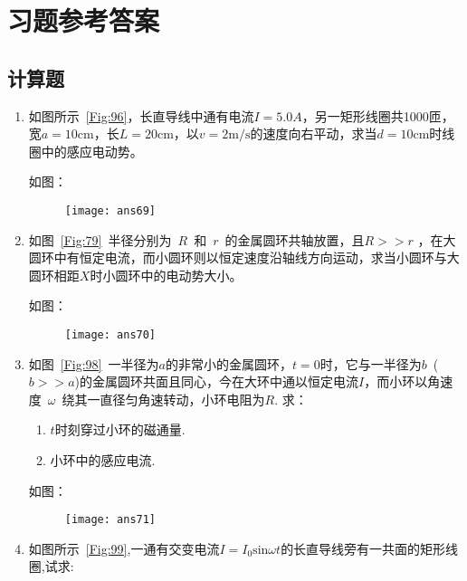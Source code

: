 \section{习题参考答案}
\subsection*{计算题}
\begin{enumerate}
    \item 如图所示~\ref{Fig:96}，长直导线中通有电流$I=5.0A$，另一矩形线圈共1000匝，宽$a=10\mathrm{cm}$，长$L=20\mathrm{cm}$，以$v=2\mathrm{m/s}$的速度向右平动，求当$d=10\mathrm{cm}$时线圈中的感应电动势。
    \begin{solution}
        如图：
        \begin{figure}[H]
            \centering
            \texttt{[image: ans69]}
        \end{figure}
    \end{solution}
    \item 如图~\ref{Fig:79}~半径分别为~$R$~和~$r$~的金属圆环共轴放置，且$R>>r$ ，在大圆环中有恒定电流，而小圆环则以恒定速度沿轴线方向运动，求当小圆环与大圆环相距$X$时小圆环中的电动势大小。
    \begin{solution}
        如图：
        \begin{figure}[H]
            \centering
            \texttt{[image: ans70]}
        \end{figure}
    \end{solution}
    \item 如图~\ref{Fig:98}~一半径为$a$的非常小的金属圆环，$t=0$时，它与一半径为$b$~($b>>a$)的金属圆环共面且同心，今在大环中通以恒定电流$I$，而小环以角速度~$\omega$~绕其一直径匀角速转动，小环电阻为$R$. 求：
    \begin{enumerate}[label=(\arabic*)]
        \item  $t$时刻穿过小环的磁通量.
        \item 小环中的感应电流.
    \end{enumerate}
    \begin{solution}
        如图：
        \begin{figure}[H]
            \centering
            \texttt{[image: ans71]}
        \end{figure}
    \end{solution}
    \item 如图所示~\ref{Fig:99},一通有交变电流$I=I_0\mathrm{sin}\omega t$的长直导线旁有一共面的矩形线圈,试求:

\end{enumerate}

